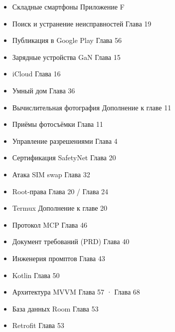 \begin{itemize}
  \item Складные смартфоны Приложение F
  \item Поиск и устранение неисправностей Глава 19
  \item Публикация в Google Play Глава 56
  \item Зарядные устройства GaN Глава 15
  \item iCloud Глава 16
  \item Умный дом Глава 36
  \item Вычислительная фотография Дополнение к главе 11
\end{itemize}


\begin{itemize}
  \item Приёмы фотосъёмки Глава 11
  \item Управление разрешениями Глава 4
  \item Сертификация SafetyNet Глава 20
  \item Атака SIM swap Глава 32
  \item Root-права Глава 20 / Глава 24
  \item Termux Дополнение к главе 20
  \item Протокол MCP Глава 46
  \item Документ требований (PRD) Глава 40
  \item Инженерия промптов Глава 43
  \item Kotlin Глава 50
  \item Архитектура MVVM Глава 57 · Глава 68
  \item База данных Room Глава 53
  \item Retrofit Глава 53
\end{itemize}


